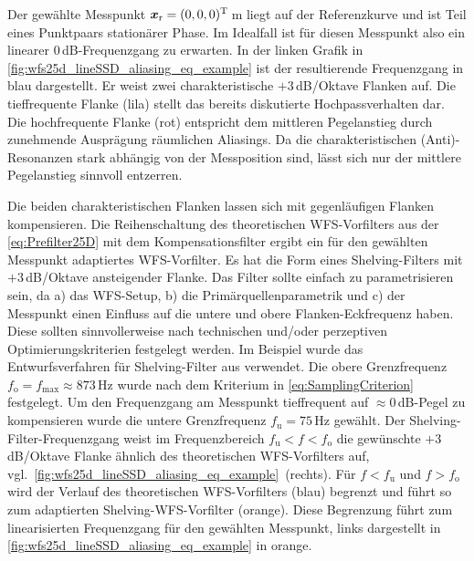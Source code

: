 %
Der gewählte Messpunkt $\bm{x}_\mathrm{r} = (0,0,0)^\mathrm{T}$\,m liegt auf der
Referenzkurve und ist Teil eines Punktpaars stationärer Phase.
%
Im Idealfall ist für diesen Messpunkt also ein linearer $0$\,dB-Frequenzgang
zu erwarten.
%
In der linken Grafik in \Abb\ref{fig:wfs25d_lineSSD_aliasing_eq_example}
ist der resultierende Frequenzgang in blau dargestellt.
%
Er weist zwei charakteristische $+3$\,dB/Oktave Flanken auf.
%
Die tieffrequente Flanke (lila) stellt das bereits diskutierte Hochpassverhalten
dar.
%
Die hochfrequente Flanke (rot) entspricht dem mittleren Pegelanstieg
durch zunehmende Ausprägung räumlichen Aliasings.
%
Da die charakteristischen (Anti)-Resonanzen stark abhängig von der
Messposition sind, lässt sich nur der mittlere Pegelanstieg sinnvoll entzerren.



Die beiden charakteristischen Flanken lassen sich mit gegenläufigen Flanken
kompensieren.
%
Die Reihenschaltung des theoretischen WFS-Vorfilters aus
der \Glg\eqref{eq:Prefilter25D} mit dem Kompensationsfilter ergibt ein für den
gewählten Messpunkt adaptiertes WFS-Vorfilter.
%
Es hat die Form eines Shelving-Filters mit $+3$\,dB/Oktave ansteigender Flanke.
%
Das Filter sollte einfach zu parametrisieren sein, da a) das WFS-Setup,
b) die Primärquellenparametrik und c) der Messpunkt einen Einfluss auf die untere
und obere Flanken-Eckfrequenz haben.
%
Diese sollten sinnvollerweise nach technischen und/oder perzeptiven
Optimierungskriterien festgelegt werden.
%
Im Beispiel wurde das Entwurfsverfahren für Shelving-Filter aus \cite{Schultz2020a}
verwendet.
%
Die obere Grenzfrequenz $f_\text{o}=f_\text{max} \approx 873$\,Hz wurde
nach dem Kriterium in \Glg\eqref{eq:SamplingCriterion} festgelegt.
%
Um den Frequenzgang am Messpunkt tieffrequent auf $\approx 0$\,dB-Pegel zu
kompensieren wurde die untere Grenzfrequenz $f_\text{u}=75$\,Hz
gewählt.
%
Der Shelving-Filter-Frequenzgang weist im Frequenzbereich $f_\text{u} < f < f_\text{o}$
die gewünschte $+3$\,dB/Oktave Flanke ähnlich des theoretischen WFS-Vorfilters auf,
vgl.~\Abb\ref{fig:wfs25d_lineSSD_aliasing_eq_example}~(rechts).
%
Für $f<f_\text{u}$ und $f>f_\text{o}$ wird der Verlauf des
theoretischen WFS-Vorfilters (blau) begrenzt und führt so zum adaptierten
Shelving-WFS-Vorfilter (orange).
%
Diese Begrenzung führt zum linearisierten Frequenzgang für den gewählten Messpunkt,
links dargestellt in \Abb\ref{fig:wfs25d_lineSSD_aliasing_eq_example} in orange.



